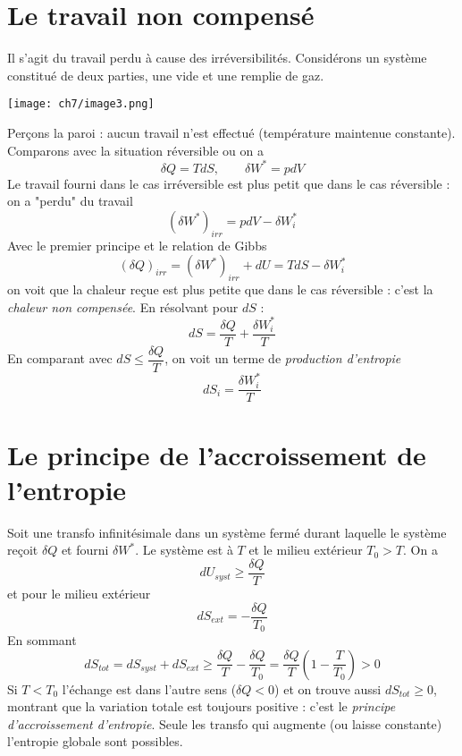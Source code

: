 	\section{Le travail non compensé}
	Il s'agit du travail perdu à cause des irréversibilités. Considérons un 
	système constitué de deux parties, une vide et une remplie de gaz. 
			\begin{center}
	\texttt{[image: ch7/image3.png]}
	\end{center}	
	Perçons 
	la paroi : aucun travail n'est effectué (température maintenue constante). 
	Comparons avec la situation réversible ou on a 
	\begin{equation}
	\delta Q = TdS,\qquad \delta W^* = pdV
	\end{equation}
	Le travail fourni dans le cas irréversible est plus petit que dans le cas 
	réversible : on a "perdu" du travail 
	\begin{equation}
	(\delta W^*)_{irr} = pdV - \delta W_i^*
	\end{equation}
	Avec le premier principe et le relation de Gibbs
	\begin{equation}
	(\delta Q)_{irr} = (\delta W^*)_{irr} + dU = TdS - \delta W_i^*
	\end{equation}
	on voit que la chaleur reçue est plus petite que dans le cas réversible : 
	c'est la \textit{chaleur non compensée}. En résolvant pour $dS$ :
	\begin{equation}
	dS = \dfrac{\delta Q}{T}+\dfrac{\delta W_i^*}{T}
	\end{equation}
	En comparant avec $dS \leq \dfrac{\delta Q}{T}$, on voit un terme de 
	\textit{production d'entropie}
	\begin{equation}
	dS_i = \dfrac{\delta W_i^*}{T}
	\end{equation}
	
	
	\section{Le principe de l’accroissement de l’entropie}
	Soit une transfo infinitésimale dans un système fermé durant laquelle le 
	système reçoit $\delta Q$ et fourni $\delta W^*$. Le système est à $T$ et 
	le milieu extérieur $T_0>T$. On a 
	\begin{equation}
	dU_{syst} \geq \dfrac{\delta Q}{T}
	\end{equation}
	et pour le milieu extérieur 
	\begin{equation}
	dS_{ext} = -\dfrac{\delta Q}{T_0}
	\end{equation}
	En sommant
	\begin{equation}
	dS_{tot} = dS_{syst} + dS_{ext} \geq \dfrac{\delta Q}{T}-\dfrac{\delta Q}{
	T_0} = \dfrac{\delta Q}{T}\left(1-\dfrac{T}{T_0}\right) > 0
	\end{equation}
	Si $T < T_0$ l'échange est dans l'autre sens ($\delta Q <0$) et on trouve 
	aussi $dS_{tot} \geq 0$, montrant que la variation totale est toujours 
	positive : c'est le \textit{principe d'accroissement d'entropie}. Seule les 
	transfo qui augmente (ou laisse constante) l'entropie globale sont possibles.\\
	
